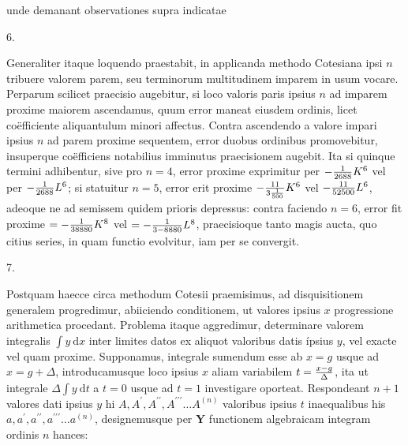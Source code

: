 \documentclass[twoside,12pt, showframe]{memoir}
\let\oldfrac\frac
\def\frac#1#2{\mathchoice{\tfrac{#1}{#2}}{\oldfrac{#1}{#2}}{\genfrac{}{}{}{2}{#1}{#2\mathstrut}}{\genfrac{}{}{}{3}{#1}{#2\mathstrut}}}
\begin{document}
unde demanant observationes supra indicatae

6.

Generaliter itaque loquendo praestabit, in applicanda methodo Cotesiana ipsi \(n\) tribuere valorem parem, seu terminorum multitudinem imparem in usum vocare. Perparum scilicet praecisio augebitur, si loco valoris paris ipsius \(n\) ad imparem proxime maiorem ascendamus, quum error maneat eiusdem ordinis, licet coëfficiente aliquantulum minori affectus. Contra ascendendo a valore impari ipsius \(n\) ad parem proxime sequentem, error duobus ordinibus promovebitur, insuperque coëfficiens notabilius imminutus praecisionem augebit. Ita si quinque termini adhibentur, sive pro \(n=4\), error proxime exprimitur per \(-\frac{1}{2688} K^{6}\) vel per \(-\frac{1}{2688} L^{6}\); si statuitur \(n=5\), error erit proxime \(-\frac{11}{3 \frac{1}{500}} K^{6}\) vel \(-\frac{11}{52500} L^{6}\), adeoque ne ad semissem quidem prioris depressus: contra faciendo \(n=6\), error fit proxime \(=-\frac{1}{38880} K^{8}\) vel \(=-\frac{1}{3-8880} L^{8}\), praecisioque tanto magis aucta, quo citius series, in quam functio evolvitur, iam per se convergit.

7.

Postquam haecce circa methodum Cotesii praemisimus, ad disquisitionem generalem progredimur, abiiciendo conditionem, ut valores ipsius \(x\) progressione arithmetica procedant. Problema itaque aggredimur, determinare valorem integralis \(\int y \mathrm{~d} x\) inter limites datos ex aliquot valoribus datis ípsius \(y\), vel exacte vel quam proxime. Supponamus, integrale sumendum esse ab \(x=g\) usque ad \(x=g+\Delta\), introducamusque loco ipsius \(x\) aliam variabilem \(t=\frac{x-g}{\Delta}\), ita ut integrale \(\Delta \int y \mathrm{~d} t\) a \(t=0\) usque ad \(t=1\) investigare oporteat. Respondeant \(n+1\) valores dati ipsius \(y\) hi \(A, A^{\prime}, A^{\prime \prime}, A^{\prime \prime \prime} \ldots A^{(n)}\) valoribus ipsius \(t\) inaequalibus his \(a, a^{\prime}, a^{\prime \prime}, a^{\prime \prime \prime} \ldots a^{(n)}\), designemusque per \(\boldsymbol{Y}\) functionem algebraicam integram ordinis \(n\) hances:
\end{document}
